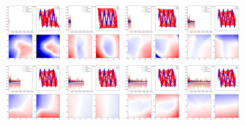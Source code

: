 \documentclass[lang=cn,11pt]{elegantpaper}
\begin{document}
\begin{figure}[hbt]
  \centering
  \includegraphics[width=0.22\textwidth]{sin_5_1}
  \includegraphics[width=0.22\textwidth]{sin_5_2}
  \includegraphics[width=0.22\textwidth]{sin_5_3}
  \includegraphics[width=0.22\textwidth]{sin_5_4}\\
  \includegraphics[width=0.22\textwidth]{sin_6_1}
  \includegraphics[width=0.22\textwidth]{sin_6_2}
  \includegraphics[width=0.22\textwidth]{sin_6_3}
  \includegraphics[width=0.22\textwidth]{sin_6_4}
\end{figure}
\end{document}
